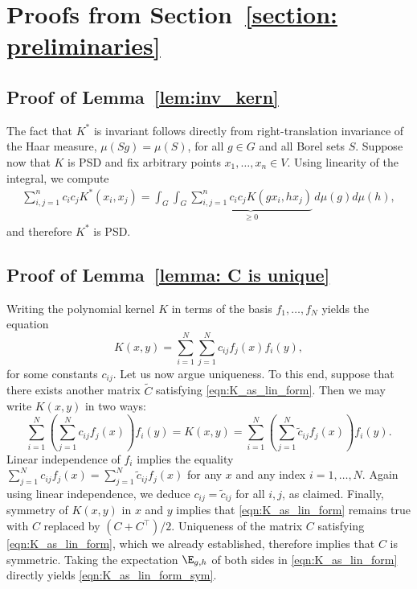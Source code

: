 \section{Proofs from Section~\ref{section: preliminaries}}\label{app:prelim-proofs}
\subsection{Proof of Lemma~\ref{lem:inv_kern}}\label{sec:proof_lem_inv}
The fact that $K^*$ is invariant follows directly from right-translation invariance of the Haar measure, $\mu(Sg)=\mu(S)$, for all $g\in G$ and all Borel sets $S$. Suppose now that $K$ is PSD and fix 
arbitrary points $x_1, \ldots, x_n\in V$.  Using linearity of the integral, we compute 
\begin{align*}
    \sum_{i,j=1}^n c_ic_j K^*(x_i, x_j)
    = \int_G\int_{G} \underbrace{\sum_{i,j=1}^n c_ic_j K(gx_i, hx_j)}_{\geq 0}\, d\mu(g)d\mu(h),
\end{align*}
and therefore $K^*$ is PSD.

\subsection{Proof of Lemma~\ref{lemma: C is unique}}\label{sec:proof_lembilin}
Writing the polynomial kernel $K$ in terms of the basis $f_1, \ldots, f_N$  yields the equation 
$$ K(x,y)=\sum_{i=1}^N\sum_{j=1}^N c_{ij} f_j(x)f_i(y),$$
for some constants $c_{ij}$. Let us now argue uniqueness. To this end, suppose that there exists another matrix $\tilde C$ satisfying \eqref{eqn:K_as_lin_form}. Then we may write $K(x,y)$ in two ways:
$$\sum_{i=1}^N\left(\sum_{j=1}^N c_{ij} f_j(x)\right) f_i(y)=K(x,y)=\sum_{i=1}^N\left(\sum_{j=1}^N \tilde c_{ij} f_j(x)\right)f_i(y).$$
Linear independence of $f_i$ implies the equality $\sum_{j=1}^N c_{ij} f_j(x)=\sum_{j=1}^N \tilde c_{ij} f_j(x)$ for any $x$ and any index $i=1,\dots,N$. Again using linear independence, we deduce $c_{ij}=\tilde c_{ij}$ for all $i,j$, as claimed. Finally, symmetry of $K(x,y)$ in $x$ and $y$ implies that \eqref{eqn:K_as_lin_form} remains true with $C$ replaced by $(C+C^\top)/2$. Uniqueness of the matrix $C$ satisfying \eqref{eqn:K_as_lin_form}, which we already established, therefore implies that $C$ is symmetric. Taking the expectation $\E_{g,h}$ of both sides in \eqref{eqn:K_as_lin_form} directly yields \eqref{eqn:K_as_lin_form_sym}.

